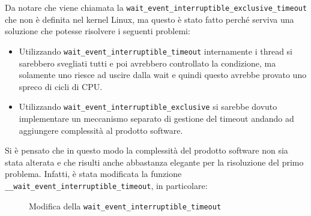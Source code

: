 \documentclass[oneside]{article}
\begin{document}
\begin{itemize}
\begin{itemize}
\begin{enumerate}
Da notare che viene chiamata la \texttt{wait\_event\_interruptible\_exclusive\_timeout} che non è definita nel kernel Linux, ma questo è stato fatto perché serviva una soluzione che potesse risolvere i seguenti problemi:
\begin{itemize}
\item Utilizzando \texttt{wait\_event\_interruptible\_timeout} internamente i thread si sarebbero svegliati tutti e poi avrebbero controllato la condizione, ma solamente uno riesce ad uscire dalla wait e quindi questo avrebbe provato uno spreco di cicli di CPU.
\item Utilizzando \texttt{wait\_event\_interruptible\_exclusive} si sarebbe dovuto implementare un meccanismo separato di gestione del timeout andando ad aggiungere complessità al prodotto software.
\end{itemize}
Si è pensato che in questo modo la complessità del prodotto software non sia stata alterata e che risulti anche abbastanza elegante per la risoluzione del primo problema. Infatti, è stata modificata la funzione \texttt{\_\_wait\_event\_interruptible\_timeout}, in particolare:
\begin{figure}[ht!]
\centering
{}
\caption{Modifica della \texttt{wait\_event\_interruptible\_timeout}}
\label{img:fig-wait}
\end{figure}


\end{enumerate}
\end{itemize}
\end{itemize}
\end{document}
